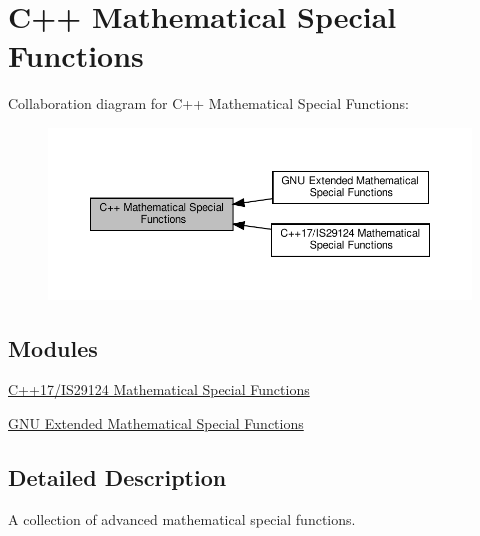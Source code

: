 \hypertarget{group__math__spec__func}{}\section{C++ Mathematical Special Functions}
\label{group__math__spec__func}
Collaboration diagram for C++ Mathematical Special Functions\+:
\nopagebreak
\begin{figure}[H]
\begin{center}
\leavevmode
\includegraphics[width=350pt]{group__math__spec__func}
\end{center}
\end{figure}
\subsection*{Modules}
\begin{DoxyCompactItemize}
\item 
\hyperlink{group__cxx17__math__spec__func}{C++17/\+I\+S29124 Mathematical Special Functions}
\item 
\hyperlink{group__gnu__math__spec__func}{G\+N\+U Extended Mathematical Special Functions}
\end{DoxyCompactItemize}


\subsection{Detailed Description}
A collection of advanced mathematical special functions. 